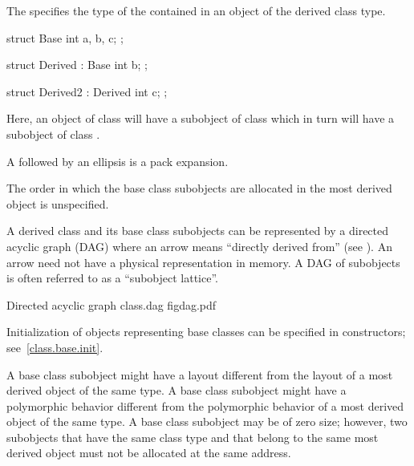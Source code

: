 \pnum
The  specifies the type of the
 contained in an
object of the derived class type.
\begin{example}
\begin{codeblock}
struct Base {
  int a, b, c;
};
\end{codeblock}

\begin{codeblock}
struct Derived : Base {
  int b;
};
\end{codeblock}

\begin{codeblock}
struct Derived2 : Derived {
  int c;
};
\end{codeblock}

Here, an object of class  will have a subobject of class
 which in turn will have a subobject of class
.
\end{example}

\pnum
A  followed by an ellipsis is a pack
expansion.

\pnum
The order in which the base class subobjects are allocated in the most
derived object is unspecified.
\begin{note}
%
%
A derived class and its base class subobjects can be represented by a
directed acyclic graph (DAG) where an arrow means ``directly derived
from'' (see ).
An arrow need not have a physical representation in memory.
A DAG of subobjects is often referred to as a ``subobject lattice''.

\begin{importgraphic}
{Directed acyclic graph}
{class.dag}
{figdag.pdf}
\end{importgraphic}
\end{note}

\pnum
\begin{note}
Initialization of objects representing base classes can be specified in
constructors; see~\ref{class.base.init}.
\end{note}

\pnum
\begin{note}
A base class subobject might have a layout different
from the layout of a most derived object of the same type. A base class
subobject might have a polymorphic behavior
different from the polymorphic behavior of a most derived object of the
same type. A base class subobject may be of zero size;
however, two subobjects that have the same class type and that belong to
the same most derived object must not be allocated at the same
address.
\end{note}

